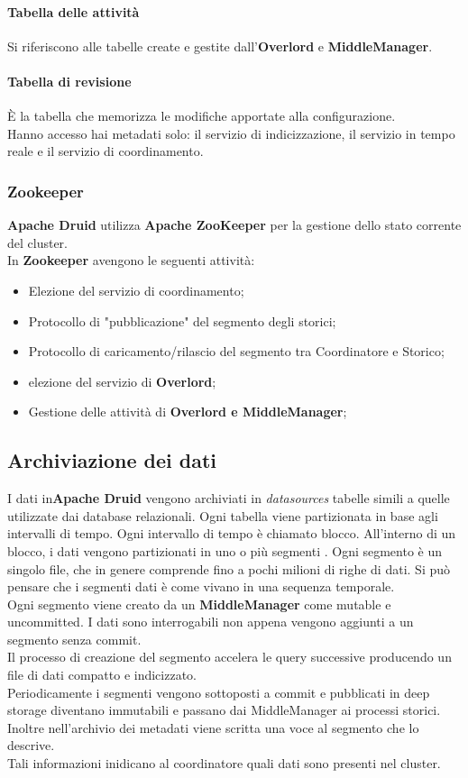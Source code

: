 \documentclass{article}
\begin{document}
\paragraph{Tabella delle attività}
Si riferiscono alle tabelle create e gestite dall'\textbf{Overlord} e \textbf{MiddleManager}.
\paragraph{Tabella di revisione}
È la tabella che memorizza le modifiche apportate alla configurazione.\\
Hanno accesso hai metadati solo: il servizio di indicizzazione, il servizio in tempo reale e il servizio di coordinamento.
\subsubsection{Zookeeper}
\textbf{Apache Druid} utilizza \textbf{Apache ZooKeeper} per la gestione dello stato corrente del cluster.\\
In \textbf{Zookeeper} avengono le seguenti attività: 
\begin{itemize}
    \item Elezione del servizio di coordinamento;
    \item Protocollo di "pubblicazione" del segmento degli storici;
    \item Protocollo di caricamento/rilascio del segmento tra Coordinatore e Storico;
    \item elezione del servizio di \textbf{Overlord};
    \item Gestione delle attività di \textbf{Overlord e MiddleManager};
    
\end{itemize}

\subsection{Archiviazione dei dati}
I dati in\textbf{Apache Druid} vengono archiviati in \textit{datasources} tabelle simili a quelle utilizzate dai database relazionali. Ogni tabella viene partizionata in base agli intervalli di tempo. Ogni intervallo di tempo è chiamato blocco. All'interno di un blocco, i dati vengono partizionati in uno o più segmenti . Ogni segmento è un singolo file, che in genere comprende fino a pochi milioni di righe di dati. Si può pensare che i segmenti dati è come vivano in una sequenza temporale.\\
Ogni segmento viene creato da un \textbf{MiddleManager} come mutable e uncommitted.  I dati sono interrogabili non appena vengono aggiunti a un segmento senza commit.\\
Il processo di creazione del segmento accelera le query successive producendo un file di dati compatto e indicizzato. \\
Periodicamente i segmenti vengono sottoposti a commit e pubblicati in deep storage diventano immutabili e passano dai MiddleManager ai processi storici. Inoltre nell'archivio dei metadati viene scritta una voce al segmento che lo descrive.\\
Tali informazioni inidicano al coordinatore quali dati sono presenti nel cluster.
\end{document}
